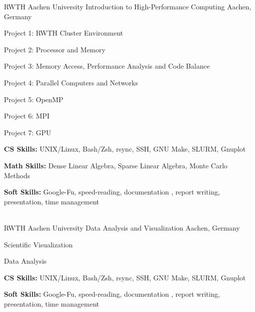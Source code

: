 

\begin{cventries}
  \cventry
    {RWTH Aachen University} %
    {Introduction to High-Performance Computing} %
    {Aachen, Germany} %
    {} %
    {
      \begin{cvitems} %
        \item {Project 1: RWTH Cluster Environment}
        \item {Project 2: Processor and Memory}
        \item {Project 3: Memory Access, Performance Analysis and Code Balance}
        \item {Project 4: Parallel Computers and Networks}
        \item {Project 5: OpenMP}
        \item {Project 6: MPI}
        \item {Project 7: GPU}
        \item {\textbf{CS Skills:} UNIX/Linux, Bash/Zsh, rsync, SSH, GNU Make, SLURM, Gnuplot}
        \item {\textbf{Math Skills:} Dense Linear Algebra, Sparse Linear Algebra, Monte Carlo Methods}
        \item {\textbf{Soft Skills:} Google-Fu, speed-reading, documentation , report writing, presentation, time management}
      \end{cvitems}
    }\\
  \cventry
    {RWTH Aachen University} %
    {Data Analysis and Visualization} %
    {Aachen, Germany} %
    {} %
    {
      \begin{cvitems} %
        \item {Scientific Visualization}
        \item {Data Analysis}
        \item {\textbf{CS Skills:} UNIX/Linux, Bash/Zsh, rsync, SSH, GNU Make, SLURM, Gnuplot}
        \item {\textbf{Soft Skills:} Google-Fu, speed-reading, documentation , report writing, presentation, time management}

\end{cvitems}}
\end{cventries}
